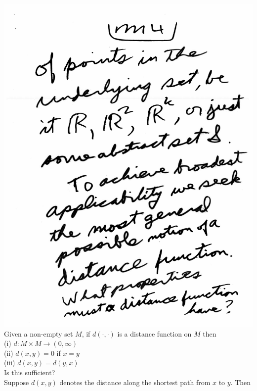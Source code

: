 \documentclass[10pt,a4paper]{article}
\begin{document}
{{\\\includegraphics[scale=0.5]{Pages/MetricSpace1_4.pdf}
\pagebreak
\\Given a non-empty set $M$, if $d(\cdot, \cdot)$ is a distance function on $M$ then 
\\(i) $d : M \times M\rightarrow (0, \infty)$
\\(ii) $d(x,y)=0$ if $x=y$
\\(iii) $d(x,y)=d(y,x)$
\\Is this sufficient?
\\Suppose $d(x,y)$ denotes the distance along the shortest path from $x$ to $y$. Then
}}
\end{document}
